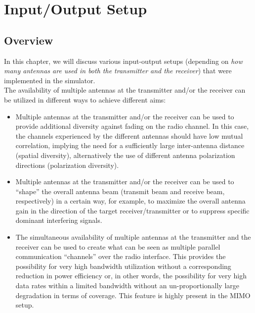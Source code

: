 \chapter{Input/Output Setup}

\section{Overview}
In this chapter, we will discuss various input-output setups (depending on \emph{how many antennas are used in both the transmitter and the receiver}) that were implemented in the simulator. \\
The availability of multiple antennas at the transmitter and/or the receiver can be utilized in different ways to achieve different aims:
\begin{itemize}
    \item Multiple antennas at the transmitter and/or the receiver can be used to provide additional diversity against fading on the radio channel. In this case, the channels experienced by the different antennas should have low mutual correlation, implying the need for a sufficiently large inter-antenna distance (spatial diversity), alternatively the use of different antenna polarization directions (polarization diversity).
    \item Multiple antennas at the transmitter and/or the receiver can be used to “shape” the overall antenna beam (transmit beam and receive beam, respectively) in a certain way, for example, to maximize the overall antenna gain in the direction of the target receiver/transmitter or to suppress specific dominant interfering signals.
    \item The simultaneous availability of multiple antennas at the transmitter and the receiver can be used to create what can be seen as multiple parallel communication “channels” over the radio interface. This provides the possibility for very high bandwidth utilization without a corresponding reduction in power efficiency or, in other words, the possibility for very high data rates within a limited bandwidth without an un-proportionally large degradation in terms of coverage. This feature is highly present in the MIMO setup.
\end{itemize}

